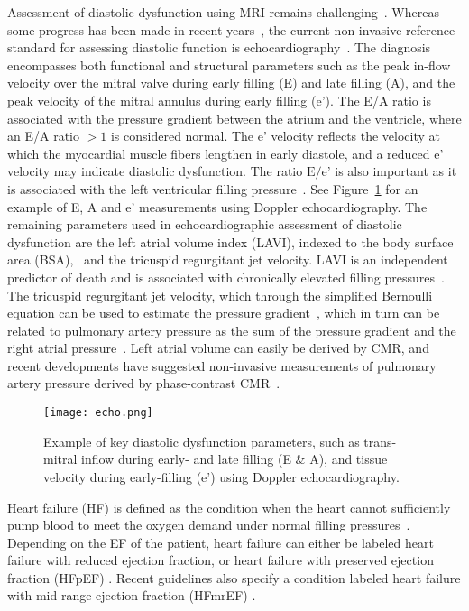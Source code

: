 Assessment of diastolic dysfunction using MRI remains challenging~\cite{Caudron2011}. Whereas some progress has been made in recent years~\cite{Flachskampf2015, Seemann2018}, the current non-invasive reference standard for assessing diastolic function is echocardiography~\cite{Nagueh2016}. The diagnosis encompasses both functional and structural parameters such as the peak in-flow velocity over the mitral valve during early filling (E) and late filling (A), and the peak velocity of the mitral annulus during early filling (e'). The E/A ratio is associated with the pressure gradient between the atrium and the ventricle, where an E/A ratio $>1$ is considered normal. The e' velocity reflects the velocity at which the myocardial muscle fibers lengthen in early diastole, and a reduced e' velocity may indicate diastolic dysfunction. The ratio $\textrm{E}/\textrm{e'}$ is also important as it is associated with the left ventricular filling pressure~\cite{Park2011}. See Figure~\ref{fig:echo} for an example of E, A and e' measurements using Doppler echocardiography. The remaining parameters used in echocardiographic assessment of diastolic dysfunction are the left atrial volume index (LAVI),  indexed to the body surface area (BSA),~\cite{Mosteller1987}  and the tricuspid regurgitant jet velocity. LAVI is an independent predictor of death and is associated with chronically elevated filling pressures~\cite{Pritchett2005}. The tricuspid regurgitant jet velocity, which through the simplified Bernoulli equation can be used to estimate the pressure gradient~\cite{Baumgartner2009}, which in turn can be related to pulmonary artery pressure as the sum of the pressure gradient and the right atrial pressure~\cite{Aduen2011}. Left atrial volume can easily be derived by CMR, and recent developments have suggested non-invasive measurements of pulmonary artery pressure derived by phase-contrast CMR~\cite{Reiter2013, Ramos2020}.
\begin{figure}[htbp]
\centering
\texttt{[image: echo.png]}
\caption{Example of key diastolic dysfunction parameters, such as trans-mitral inflow during early- and late filling (E \& A), and tissue velocity during early-filling (e') using Doppler echocardiography.}
\label{fig:echo}
\end{figure}
Heart failure (HF) is defined as the condition when the heart cannot sufficiently pump blood to meet the oxygen demand under normal filling pressures~\cite{Hall2016}. Depending on the EF of the patient, heart failure can either be labeled heart failure with reduced ejection fraction,  or heart failure with preserved ejection fraction (HFpEF) . Recent guidelines also specify a condition labeled heart failure with mid-range ejection fraction (HFmrEF) \cite{Ponikowski2016}.

